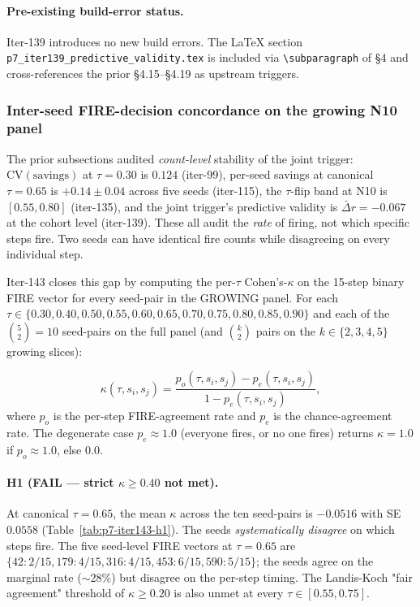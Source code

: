\documentclass{article}
\begin{document}
\paragraph{Pre-existing build-error status.}
Iter-139 introduces no new build errors.  The LaTeX section
\texttt{p7\_iter139\_predictive\_validity.tex} is included via
\texttt{\textbackslash subparagraph} of §4 and cross-references the
prior §4.15--§4.19 as upstream triggers.
 

\subsubsection{Inter-seed FIRE-decision concordance on the growing N10 panel}
\label{sec:p7-iter143-decision-concordance}

The prior subsections audited \emph{count-level} stability of the joint
trigger: $\mathrm{CV}(\mathrm{savings})$ at $\tau=0.30$ is $0.124$
(iter-99), per-seed savings at canonical $\tau=0.65$ is $+0.14 \pm 0.04$
across five seeds (iter-115), the $\tau$-flip band at N10 is
$[0.55, 0.80]$ (iter-135), and the joint trigger's predictive validity
is $\bar\Delta r = -0.067$ at the cohort level (iter-139). These all
audit the \emph{rate} of firing, not which specific steps fire. Two
seeds can have identical fire counts while disagreeing on every
individual step.

Iter-143 closes this gap by computing the per-$\tau$ Cohen's-$\kappa$
on the 15-step binary FIRE vector for every seed-pair in the
GROWING panel. For each $\tau \in \{0.30, 0.40, 0.50, 0.55, 0.60,
0.65, 0.70, 0.75, 0.80, 0.85, 0.90\}$ and each of the $\binom{5}{2}=10$
seed-pairs on the full panel (and $\binom{k}{2}$ pairs on the
$k \in \{2,3,4,5\}$ growing slices):

\[
\kappa(\tau, s_i, s_j)
= \frac{p_o(\tau, s_i, s_j) - p_e(\tau, s_i, s_j)}
       {1 - p_e(\tau, s_i, s_j)},
\]
where $p_o$ is the per-step FIRE-agreement rate and $p_e$ is the
chance-agreement rate. The degenerate case $p_e \approx 1.0$
(everyone fires, or no one fires) returns $\kappa = 1.0$ if
$p_o \approx 1.0$, else $0.0$.

\paragraph{H1 (FAIL --- strict $\kappa \geq 0.40$ not met).}
At canonical $\tau=0.65$, the mean $\kappa$ across the ten seed-pairs
is $-0.0516$ with SE $0.0558$ (Table~\ref{tab:p7-iter143-h1}). The
seeds \emph{systematically disagree} on which steps fire. The
five seed-level FIRE vectors at $\tau=0.65$ are
$\{42: 2/15, 179: 4/15, 316: 4/15, 453: 6/15, 590: 5/15\}$; the seeds
agree on the marginal rate ($\sim 28\%$) but disagree on the per-step
timing. The Landis-Koch "fair agreement" threshold of $\kappa \geq 0.20$
is also unmet at every $\tau \in [0.55, 0.75]$.
\end{document}
